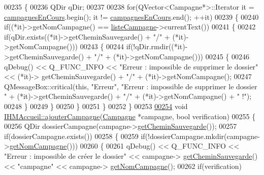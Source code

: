 \begin{DoxyCode}
{00235 \{
00236     QDir qDir;
00237 
00238     \textcolor{keywordflow}{for}(QVector<Campagne*>::Iterator it = \hyperlink{class_i_h_m_accueil_ad3827b81480eb201b5927c16a2ad1c46}{campagnesEnCours}.begin(); it != 
      \hyperlink{class_i_h_m_accueil_ad3827b81480eb201b5927c16a2ad1c46}{campagnesEnCours}.end(); ++it)
00239     \{
00240         \textcolor{keywordflow}{if}((*it)->getNomCampagne() == \hyperlink{class_i_h_m_accueil_afb828a4e06c25afa40341c310cd85b08}{listeCampagne}->currentText())
00241         \{
00242             \textcolor{keywordflow}{if}(qDir.exists((*it)->getCheminSauvegarde() + \textcolor{stringliteral}{"/"} + (*it)->getNomCampagne()))
00243             \{
00244                 \textcolor{keywordflow}{if}(!qDir.rmdir((*it)->getCheminSauvegarde() + \textcolor{stringliteral}{"/"} + (*it)->getNomCampagne()))
00245                 \{
00246                     qDebug() << Q\_FUNC\_INFO << \textcolor{stringliteral}{"Erreur : impossible de supprimer le dossier"} << (*it)->
      getCheminSauvegarde() + \textcolor{stringliteral}{"/"} + (*it)->getNomCampagne();
00247                     QMessageBox::critical(\textcolor{keyword}{this}, \textcolor{stringliteral}{"Erreur"}, \textcolor{stringliteral}{"Erreur : impossible de supprimer le dossier "} + 
      (*it)->getCheminSauvegarde() + \textcolor{stringliteral}{"/"} + (*it)->getNomCampagne() + \textcolor{stringliteral}{" !"});
00248                 \}
00249             \}
00250         \}
00251     \}
00252 \}
00253 
\hyperlink{class_i_h_m_accueil_a3087ce7a78561c79ce3148761750dd1d}{00254} \textcolor{keywordtype}{void} \hyperlink{class_i_h_m_accueil_a3087ce7a78561c79ce3148761750dd1d}{IHMAccueil::ajouterCampagne}(\hyperlink{class_campagne}{Campagne} *campagne, \textcolor{keywordtype}{bool} verification)
00255 \{
00256     QDir dossierCampagne(campagne->\hyperlink{class_campagne_ad752790357417d83a93056d9c9689a16}{getCheminSauvegarde}());
00257     \textcolor{keywordflow}{if}(dossierCampagne.exists())
00258     \{
00259         \textcolor{keywordflow}{if}(!dossierCampagne.mkdir(campagne->\hyperlink{class_campagne_a99a682fcb8e5a3f8c2aff7a44eb2c930}{getNomCampagne}()))
00260         \{
00261             qDebug() << Q\_FUNC\_INFO << \textcolor{stringliteral}{"Erreur : impossible de créer le dossier"} << campagne->
      \hyperlink{class_campagne_ad752790357417d83a93056d9c9689a16}{getCheminSauvegarde}() << \textcolor{stringliteral}{"campagne"} << campagne->
      \hyperlink{class_campagne_a99a682fcb8e5a3f8c2aff7a44eb2c930}{getNomCampagne}();
00262             \textcolor{keywordflow}{if}(verification)
}
\end{DoxyCode}
